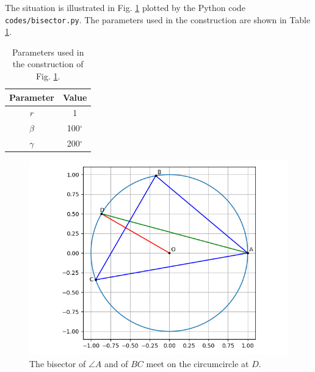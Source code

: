 \documentclass[journal,12pt,twocolumn]{IEEEtran}
\begin{document}
\begin{enumerate}
    The situation is illustrated in Fig. \ref{fig:bisector} plotted 
    by the Python code \texttt{codes/bisector.py}. The parameters
    used in the construction are shown in Table \ref{tab:param}.
    \begin{table}[!ht]
        \centering
        \begin{tabular}{|c|c|}
            \hline
            \textbf{Parameter} & \textbf{Value} \\
            \hline
            $r$ & 1 \\
            \hline
            $\beta$ & 100$^{\circ}$ \\
            \hline
            $\gamma$ & 200$^{\circ}$ \\
            \hline
        \end{tabular}
        \caption{Parameters used in the construction of Fig. \ref{fig:bisector}.}
        \label{tab:param}
    \end{table}
    \begin{figure}[!ht]
        \centering
        \includegraphics[width=\columnwidth]{figs/bisector.png}
        \caption{The bisector of $\angle A$ and of $BC$ meet on the circumcircle at $D$.}
        \label{fig:bisector}
    \end{figure}
\end{enumerate}
\end{document}
